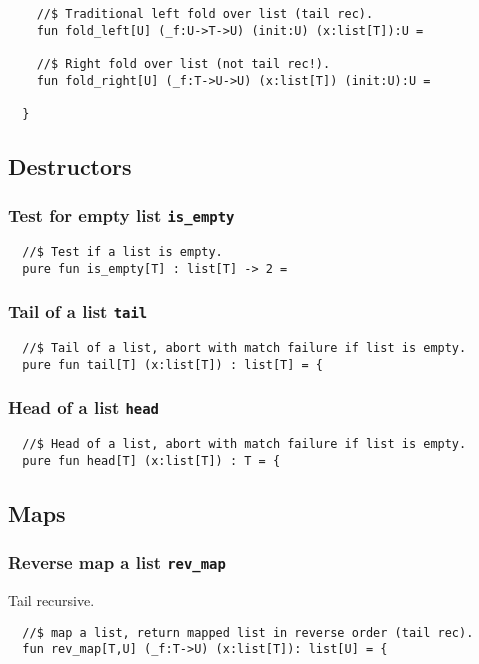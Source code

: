 \documentclass[oneside]{book}
\begin{document}
{\begin{verbatim}
    //$ Traditional left fold over list (tail rec).
    fun fold_left[U] (_f:U->T->U) (init:U) (x:list[T]):U =

    //$ Right fold over list (not tail rec!).
    fun fold_right[U] (_f:T->U->U) (x:list[T]) (init:U):U =

  }
\end{verbatim}

\subsection{Destructors}
\subsubsection{Test for empty list {\tt is\_empty}}
\begin{verbatim}
  //$ Test if a list is empty.
  pure fun is_empty[T] : list[T] -> 2 =
\end{verbatim}

\subsubsection{Tail of a list {\tt tail}}
\begin{verbatim}
  //$ Tail of a list, abort with match failure if list is empty.
  pure fun tail[T] (x:list[T]) : list[T] = {
\end{verbatim}

\subsubsection{Head of a list {\tt head}}
\begin{verbatim}
  //$ Head of a list, abort with match failure if list is empty.
  pure fun head[T] (x:list[T]) : T = {
\end{verbatim}

\subsection{Maps}
\subsubsection{Reverse map a list {\tt rev\_map}}
Tail recursive.

\begin{verbatim}
  //$ map a list, return mapped list in reverse order (tail rec).
  fun rev_map[T,U] (_f:T->U) (x:list[T]): list[U] = {
\end{verbatim}

}
\end{document}
